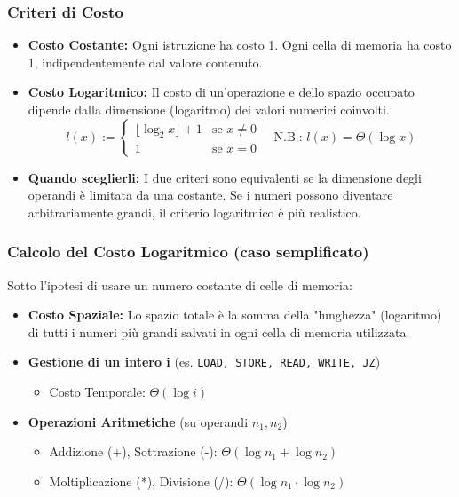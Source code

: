 \subsubsection{Criteri di Costo}
\begin{itemize}
    \item \textbf{Costo Costante:} Ogni istruzione ha costo 1. Ogni cella di memoria ha costo 1, indipendentemente dal valore contenuto.
    \item \textbf{Costo Logaritmico:} Il costo di un'operazione e dello spazio occupato dipende dalla dimensione (logaritmo) dei valori numerici coinvolti.
    $$
    l(x) := 
    \begin{cases}
        \lfloor \log_2 x \rfloor + 1 & \text{se } x \neq 0 \\
        1 & \text{se } x = 0
    \end{cases}
    \quad \text{N.B.: } l(x) = \Theta(\log x)
    $$
    \item \textbf{Quando sceglierli:} I due criteri sono equivalenti se la dimensione degli operandi è limitata da una costante. Se i numeri possono diventare arbitrariamente grandi, il criterio logaritmico è più realistico.
\end{itemize}

\subsubsection{Calcolo del Costo Logaritmico (caso semplificato)}
Sotto l'ipotesi di usare un numero costante di celle di memoria:
\begin{itemize}
    \item \textbf{Costo Spaziale:} Lo spazio totale è la somma della "lunghezza" (logaritmo) di tutti i numeri più grandi salvati in ogni cella di memoria utilizzata.
    \item \textbf{Gestione di un intero i} (es. \texttt{LOAD, STORE, READ, WRITE, JZ})
    \begin{itemize}
        \item Costo Temporale: $\Theta(\log i)$
    \end{itemize}
    \item \textbf{Operazioni Aritmetiche} (su operandi $n_1, n_2$)
    \begin{itemize}
        \item Addizione (+), Sottrazione (-): $\Theta(\log n_1 + \log n_2)$
        \item Moltiplicazione (*), Divisione (/): $\Theta(\log n_1 \cdot \log n_2)$
    \end{itemize}
\end{itemize}


